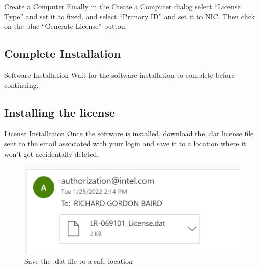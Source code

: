 \documentclass[fleqn]{beamer}
\newcommand{\quotes}[1]{``#1''}
\begin{document}
\begin{frame}{Create a Computer}
    Finally in the Create a Computer dialog select \quotes{License Type} and set it to fixed, and select \quotes{Primary ID} and set it to NIC. Then click on the blue \quotes{Generate License} button.
\end{frame}
\subsection{Complete Installation}
\begin{frame}{Software Installation}
    Wait for the software installation to complete before continuing.
\end{frame}
\subsection{Installing the license}
\begin{frame}{License Installation}
    Once the software is installed, download the .dat license file sent to the email associated with your login and save it to a location where it won't get accidentally deleted.
    \begin{figure}
        \centering
        \includegraphics[scale=.8]{figures/licensedat.png}
        \caption{Save the .dat file to a safe location}
        \label{fig:my_label}
    \end{figure}
\end{frame}
\end{document}
